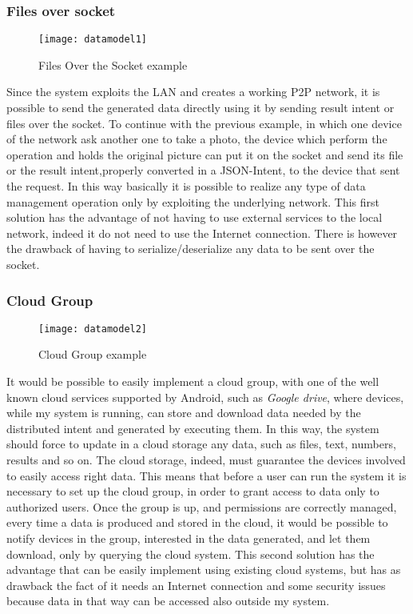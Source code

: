  \subsubsection{Files over socket}\label{fos}
 \begin{figure}[ht]
 	\centering
 	\texttt{[image: datamodel1]}
 	\caption{Files Over the Socket example}
 	\label{fig:4.5}
 \end{figure}
 Since the system exploits the LAN and creates a working P2P network, it is possible to send the generated data directly using it by sending result intent or files over the socket. To continue with the previous example, in which one device of the network ask another one to take a photo, the device which perform the operation and holds the original picture can put it on the socket and send its file or the result intent,properly converted in a JSON-Intent, to the device that sent the request. In this way basically it is possible to realize any type of data management operation only by exploiting the underlying network. This first solution has the advantage of not having to use external services to the local network, indeed it do not need to use the Internet connection. There is however the drawback of having to serialize/deserialize any data to be sent over the socket.
 \subsubsection{Cloud Group}
 \begin{figure}[h]
 	\centering
 	\texttt{[image: datamodel2]}
 	\caption{Cloud Group example}
 	\label{fig:4.6}
 \end{figure}
 It would be possible to easily implement a cloud group, with one of the well known cloud services supported by Android, such as \textit{Google drive}, where devices, while my system is running, can store and download data needed by the distributed intent and generated by executing them. In this way, the system should force to update in a cloud storage any data, such as files, text, numbers, results and so on. The cloud storage, indeed, must guarantee the devices involved to easily access right data. This means that before a user can run the system it is necessary to set up the cloud group, in order to grant access to data only to authorized users. Once the group is up, and permissions are correctly managed, every time a data is produced and stored in the cloud, it would be possible to notify devices in the group, interested in the data generated, and let them download, only by querying the cloud system.
  This second solution has the advantage that can be easily implement using existing cloud systems, but has as drawback the fact of it needs an Internet connection and some security issues because data in that way can be accessed also outside my system.
 
